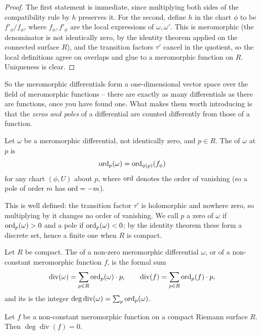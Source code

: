 \documentclass[a4paper]{scrartcl}
\newcommand{\Div}{\operatorname{div}}
\begin{document}
\begin{proof}
	The first statement is immediate, since multiplying both sides of the compatibility
	rule by $h$ preserves it. For the second, define $h$ in the chart $\phi$ to be
	$f'_\phi/f_\phi$, where $f_\phi, f'_\phi$ are the local expressions of $\omega,
	\omega'$. This is meromorphic (the denominator is not identically zero, by the identity
	theorem applied on the connected surface $R$), and the transition factors $\tau'$
	cancel in the quotient, so the local definitions agree on overlaps and glue to a
	meromorphic function on $R$. Uniqueness is clear.
\end{proof}

So the meromorphic differentials form a one-dimensional vector space over the field of
meromorphic functions -- there are exactly as many differentials as there are functions,
once you have found one. What makes them worth introducing is that the \emph{zeros and
poles} of a differential are counted differently from those of a function.

\begin{definition}[Order]
	Let $\omega$ be a meromorphic differential, not identically zero, and $p \in R$. The
	 of $\omega$ at $p$ is
	$$
	\operatorname{ord}_p(\omega) = \operatorname{ord}_{\phi(p)}(f_\phi)
	$$
	for any chart $(\phi, U)$ about $p$, where $\operatorname{ord}$ denotes the order of vanishing (so a
	pole of order $m$ has $\operatorname{ord} = -m$).
\end{definition}

This is well defined: the transition factor $\tau'$ is holomorphic and nowhere zero, so
multiplying by it changes no order of vanishing. We call $p$ a zero of $\omega$ if
$\operatorname{ord}_p(\omega) > 0$ and a pole if $\operatorname{ord}_p(\omega) < 0$; by the identity theorem these
form a discrete set, hence a finite one when $R$ is compact.

\begin{definition}
	Let $R$ be compact. The  of a non-zero meromorphic differential
	$\omega$, or of a non-constant meromorphic function $f$, is the formal sum
	$$
	\Div(\omega) = \sum_{p \in R} \ord_p(\omega)\cdot p, \qquad
	\Div(f) = \sum_{p\in R}\ord_p(f)\cdot p,
	$$
	and its  is the integer $\deg\Div(\omega) = \sum_p \ord_p(\omega)$.
\end{definition}

\begin{lemma}\label{lem:degdivf}
	Let $f$ be a non-constant meromorphic function on a compact Riemann surface $R$. Then
	$\deg\Div(f) = 0$.
\end{lemma}
\end{document}
